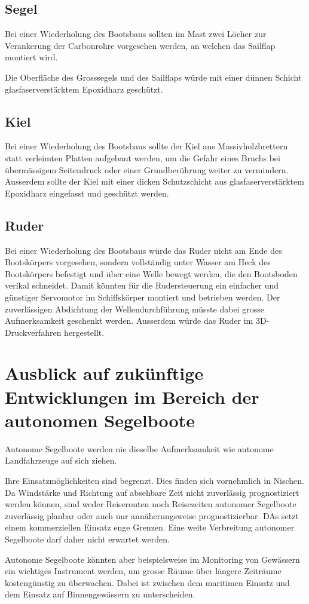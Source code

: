 \subsection{Segel}
Bei einer Wiederholung des Bootsbaus sollten im Mast zwei Löcher zur Verankerung der Carbonrohre vorgesehen werden, an welchen das Sailflap montiert wird. 

Die Oberfläche des Grosssegels und des Sailflaps würde mit einer dünnen Schicht glasfaserverstärktem Epoxidharz geschützt. 
\subsection{Kiel}
Bei einer Wiederholung des Bootsbaus sollte der Kiel aus Massivholzbrettern statt verleimten Platten aufgebaut werden, um die Gefahr eines Bruchs bei übermässigem Seitendruck oder einer Grundberührung weiter zu vermindern. Ausserdem sollte der Kiel mit einer dicken Schutzschicht aus glasfaserverstärktem Epoxidharz eingefasst und geschützt werden. 
\subsection{Ruder}
Bei einer Wiederholung des Bootsbaus würde das Ruder nicht am Ende des Bootskörpers vorgesehen, sondern vollständig unter Wasser am Heck des Bootskörpers befestigt und über eine Welle bewegt werden, die den Bootsboden verikal schneidet. Damit könnten für die Rudersteuerung ein einfacher und günstiger  Servomotor im Schiffskörper montiert und betrieben werden. Der zuverlässigen Abdichtung der Wellendurchführung müsste dabei grosse Aufmerksamkeit geschenkt werden. Ausserdem würde das Ruder im 3D-Druckverfahren hergestellt. 
\section{Ausblick auf zukünftige Entwicklungen im Bereich der autonomen Segelboote}
Autonome Segelboote werden nie dieselbe Aufmerksamkeit wie autonome Landfahrzeuge auf sich ziehen. 

Ihre Einsatzmöglichkeiten sind begrenzt. Dies finden sich vornehmlich in Nischen. Da Windstärke und Richtung auf absehbare Zeit nicht zuverlässig prognostiziert werden können, sind weder Reiserouten noch Reisezeiten autonomer Segelboote zuverlässig planbar oder auch nur annäherungsweise prognostizierbar. DAs setzt einem kommerziellen Einsatz enge Grenzen. Eine weite Verbreitung autonomer Segelboote darf daher nicht erwartet werden. 

Autonome Segelboote könnten aber beispielsweise im Monitoring von Gewässern ein wichtiges Instrument werden, um grosse Räume über längere Zeiträume kostengünstig zu überwachen. Dabei ist zwischen dem maritimen Einsatz und dem Einsatz auf Binnengewässern zu unterscheiden. 

